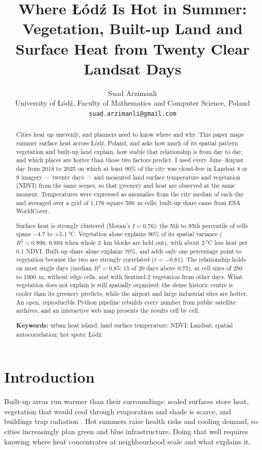\documentclass[11pt,a4paper]{article}
\title{Where Łódź Is Hot in Summer:\\ Vegetation, Built-up Land and Surface Heat from Twenty Clear Landsat Days}
\author{Suad Arzimanli\\[2pt]
        \small University of \L{}ód\'{z}, Faculty of Mathematics and Computer Science, Poland\\
        \small \texttt{suad.arzimanli@gmail.com}}
\date{}
\begin{document}
\maketitle

\begin{abstract}
Cities heat up unevenly, and planners need to know where and why. This paper maps summer surface heat across Łódź, Poland, and asks how much of its spatial pattern vegetation and built-up land explain, how stable that relationship is from day to day, and which places are hotter than those two factors predict. I used every June–August day from 2018 to 2025 on which at least 90\% of the city was cloud-free in Landsat 8 or 9 imagery --- twenty days --- and measured land surface temperature and vegetation (NDVI) from the same scenes, so that greenery and heat are observed at the same moment. Temperatures were expressed as anomalies from the city median of each day and averaged over a grid of 1,176 square 500~m cells; built-up share came from ESA WorldCover.

Surface heat is strongly clustered (Moran's $I = 0.76$): the 5th to 95th percentile of cells spans $-4.7$ to $+5.1$\,°C. Vegetation alone explains 90\% of its spatial variance ($R^2 = 0.896$; 0.894 when whole 2~km blocks are held out), with about 2\,°C less heat per 0.1 NDVI. Built-up share alone explains 70\%, and adds only one percentage point to vegetation because the two are strongly correlated ($r = -0.81$). The relationship holds on most single days (median $R^2 = 0.85$; 15 of 20 days above 0.75), at cell sizes of 250 to 1000~m, without edge cells, and with Sentinel-2 vegetation from other days. What vegetation does not explain is still spatially organised: the dense historic centre is cooler than its greenery predicts, while the airport and large industrial sites are hotter. An open, reproducible Python pipeline rebuilds every number from public satellite archives, and an interactive web map presents the results cell by cell.

\medskip
\noindent\textbf{Keywords:} urban heat island; land surface temperature; NDVI; Landsat; spatial autocorrelation; hot spots; Łódź.
\end{abstract}

\section{Introduction}

Built-up areas run warmer than their surroundings: sealed surfaces store heat, vegetation that would cool through evaporation and shade is scarce, and buildings trap radiation \cite{oke1982}. Hot summers raise health risks and cooling demand, so cities increasingly plan green and blue infrastructure. Doing that well requires knowing where heat concentrates at neighbourhood scale and what explains it.
\end{document}
